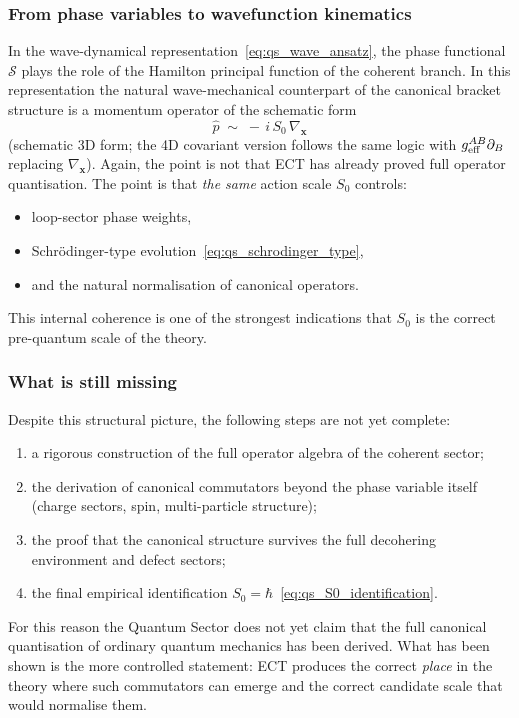 \subsubsection*{From phase variables to wavefunction kinematics}

In the wave-dynamical representation~\eqref{eq:qs_wave_ansatz}, the
phase functional $\mathcal{S}$ plays the role of the Hamilton
principal function of the coherent branch.
In this representation the natural wave-mechanical counterpart of the
canonical bracket structure is a momentum operator of the schematic form
\begin{equation}
  \label{eq:qs_p_operator}
  \hat p
  \;\sim\;
  -\,i\,S_0\,\nabla_{\mathbf{x}}
\end{equation}
(schematic 3D form; the 4D covariant version follows the same logic
with $g_{\rm eff}^{AB}\partial_B$ replacing $\nabla_{\mathbf{x}}$).
Again, the point is not that ECT has already proved full operator
quantisation.
The point is that \emph{the same} action scale $S_0$ controls:
\begin{itemize}
  \item loop-sector phase weights,
  \item Schr\"odinger-type evolution~\eqref{eq:qs_schrodinger_type},
  \item and the natural normalisation of canonical operators.
\end{itemize}
This internal coherence is one of the strongest indications that $S_0$
is the correct pre-quantum scale of the theory.

\subsubsection*{What is still missing}

Despite this structural picture, the following steps are not yet
complete:
\begin{enumerate}[label=(\roman*)]
  \item a rigorous construction of the full operator algebra of the
    coherent sector;
  \item the derivation of canonical commutators beyond the phase
    variable itself (charge sectors, spin, multi-particle structure);
  \item the proof that the canonical structure survives the full
    decohering environment and defect sectors;
  \item the final empirical identification
    $S_0=\hbar$~\eqref{eq:qs_S0_identification}.
\end{enumerate}
For this reason the Quantum Sector does not yet claim that the full
canonical quantisation of ordinary quantum mechanics has been derived.
What has been shown is the more controlled statement: ECT produces the
correct \emph{place} in the theory where such commutators can emerge and
the correct candidate scale that would normalise them.

